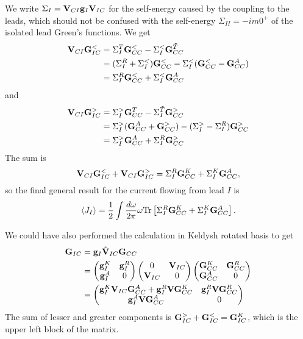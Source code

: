We write $\Sigma_I=\mathbf{V}_{CI}\mathbf{g}_I\mathbf{V}_{IC}$ for the self-energy caused by the coupling to the leads, which should not be confused with the self-energy $\Sigma_{II}=-im0^+$ of the isolated lead Green's functions. We get
\begin{alignat}{2}
 \mathbf{V}_{CI}\mathbf{G}_{IC}^< &= \Sigma_I^T \mathbf{G}_{CC}^< -\Sigma^<_I \mathbf{G}_{CC}^{\tilde{T}} \\
  &= (\Sigma_I^R+\Sigma^<_I) \mathbf{G}_{CC}^< - \Sigma^<_I( \mathbf{G}_{CC}^< - \mathbf{G}_{CC}^A) \\
  &= \Sigma_I^R \mathbf{G}_{CC}^< + \Sigma^<_I \mathbf{G}_{CC}^A
\end{alignat}
and
\begin{alignat}{2}
 \mathbf{V}_{CI}\mathbf{G}_{IC}^> &= \Sigma_I^> \mathbf{G}_{CC}^T -\Sigma^{\tilde{T}}_I \mathbf{G}_{CC}^> \\
 &= \Sigma_I^>(\mathbf{G}_{CC}^A + \mathbf{G}_{CC}^>) - (\Sigma^>_I-\Sigma^R_I) \mathbf{G}_{CC}^> \\
  &=  \Sigma_I^> \mathbf{G}_{CC}^A + \Sigma^R_I \mathbf{G}_{CC}^>
\end{alignat}
The sum is
\begin{equation}
 \mathbf{V}_{CI}\mathbf{G}_{IC}^< + \mathbf{V}_{CI}\mathbf{G}_{IC}^> = \Sigma_I^R \mathbf{G}_{CC}^K + \Sigma_{I}^K \mathbf{G}_{CC}^A,
\end{equation}
so the final general result for the current flowing from lead $I$ is
\begin{equation}
 \langle J_I \rangle = \frac{1}{2}\int \frac{d\omega}{2\pi} \omega \textrm{Tr}\left[\Sigma_I^R \mathbf{G}_{CC}^K + \Sigma_{I}^K \mathbf{G}_{CC}^A\right].
\end{equation}

We could have also performed the calculation in Keldysh rotated basis to get
\begin{alignat}{2}
 \mathbf{G}_{IC} &= \mathbf{g}_I\hat{\mathbf{V}}_{IC} \mathbf{G}_{CC} \\
  &= \left( \begin{matrix}
          \mathbf{g}_I^{K} & \mathbf{g}_I^R \\
	  \mathbf{g}_I^A & 0
            \end{matrix}
 \right) 
\left( \begin{matrix}
          0 & \mathbf{V}_{IC} \\
	  \mathbf{V}_{IC} & 0
            \end{matrix}
 \right)
\left( \begin{matrix}
          \mathbf{G}_{CC}^{K} & \mathbf{G}_{CC}^R \\
	  \mathbf{G}_{CC}^A & 0
            \end{matrix}
 \right)
\\
  &= \left(\begin{matrix}
      \mathbf{g}_I^K \mathbf{V}_{IC} \mathbf{G}^A_{CC} + \mathbf{g}_I^R \mathbf{V} \mathbf{G}_{CC}^K &  \mathbf{g}_I^R \mathbf{V} \mathbf{G}_{CC}^R \\
    \mathbf{g}_I^A \mathbf{V} \mathbf{G}_{CC}^A	& 0
     \end{matrix}
 \right)
\end{alignat}
The sum of lesser and greater components is $\mathbf{G}_{IC}^>+\mathbf{G}_{IC}^<=\mathbf{G}_{IC}^K$, which is the upper left block of the matrix.

